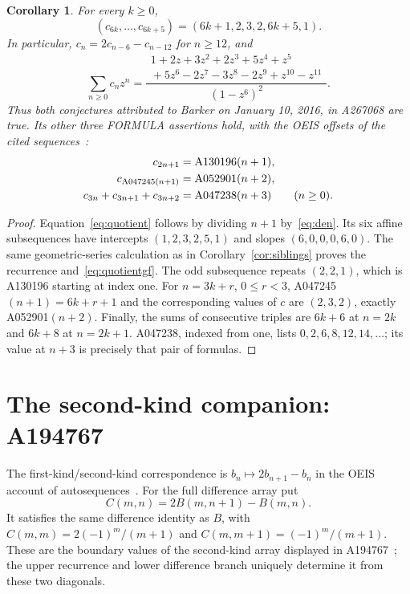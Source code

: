 \documentclass[11pt]{article}
\newtheorem{corollary}[theorem]{Corollary}
\begin{document}
\begin{corollary}\label{cor:quotients}
For every $k\ge0$,
\begin{equation}\label{eq:quotient}
 (c_{6k},\ldots,c_{6k+5})=(6k+1,2,3,2,6k+5,1).
\end{equation}
In particular, $c_n=2c_{n-6}-c_{n-12}$ for $n\ge12$, and
\begin{equation}\label{eq:quotientgf}
 \sum_{n\ge0}c_nz^n=
 \frac{\begin{gathered}1+2z+3z^2+2z^3+5z^4+z^5\\
       {}+5z^6-2z^7-3z^8-2z^9+z^{10}-z^{11}\end{gathered}}
      {(1-z^6)^2}.
\end{equation}
Thus both conjectures attributed to Barker on January 10, 2016, in
A267068 are true. Its other three FORMULA assertions hold, with the
OEIS offsets of the cited sequences~\cite{auxiliary}:
\begin{align}\label{eq:quotientlinks}
 c_{2n+1}&=\mathrm{A130196}(n+1),\notag\\
 c_{\mathrm{A047245}(n+1)}&=\mathrm{A052901}(n+2),\\
 c_{3n}+c_{3n+1}+c_{3n+2}&=\mathrm{A047238}(n+3)\qquad(n\ge0).\notag
\end{align}
\end{corollary}
\begin{proof}
Equation~\eqref{eq:quotient} follows by dividing $n+1$ by~\eqref{eq:den}.
Its six affine subsequences have intercepts $(1,2,3,2,5,1)$ and slopes
$(6,0,0,0,6,0)$. The same geometric-series calculation as in
Corollary~\ref{cor:siblings} proves the recurrence and~\eqref{eq:quotientgf}.
The odd subsequence repeats $(2,2,1)$, which is A130196 starting at index one.
For $n=3k+r$, $0\le r<3$, A047245$(n+1)=6k+r+1$ and the corresponding
values of $c$ are $(2,3,2)$, exactly A052901$(n+2)$.
Finally, the sums of consecutive triples are $6k+6$ at $n=2k$ and
$6k+8$ at $n=2k+1$. A047238, indexed from one, lists
$0,2,6,8,12,14,\ldots$; its value at $n+3$ is precisely that pair of formulas.
\end{proof}

\section{The second-kind companion: A194767}
The first-kind/second-kind correspondence is $b_n\mapsto 2b_{n+1}-b_n$
in the OEIS account of autosequences~\cite{autosequence}.
For the full difference array put
\[
 C(m,n)=2B(m,n+1)-B(m,n).
\]
It satisfies the same difference identity as $B$, with
$C(m,m)=2(-1)^m/(m+1)$ and $C(m,m+1)=(-1)^m/(m+1)$.
These are the boundary values of the second-kind array displayed in
A194767~\cite{secondkind}; the upper recurrence and lower difference branch
uniquely determine it from these two diagonals.
\end{document}
